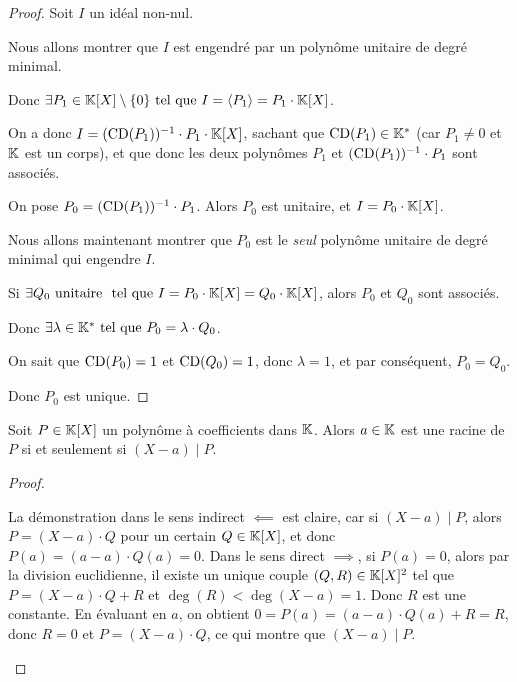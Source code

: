 \documentclass[12pt,a4paper]{report}
\begin{document}
\begin{proof}
    Soit $I$ un idéal non-nul.

    Nous allons montrer que $I$ est engendré par un polynôme unitaire de degré minimal.
    
    Donc $\exists P_1 \in \mathbb{K}[X] \setminus \{0\} \text{ tel que } I = \langle P_1 \rangle = P_1 \cdot \mathbb{K}[X]$.

    On a donc $I = (\mathrm{CD}(P_1))^{-1} \cdot P_1 \cdot \mathbb{K}[X]$, sachant que $\mathrm{CD}(P_1) \in \mathbb{K}^*$ (car $P_1 \ne 0$ et $\mathbb{K}$ est un corps), et que donc les deux polynômes $P_1$ et $(\mathrm{CD}(P_1))^{-1} \cdot P_1$ sont associés.

    On pose $P_0 = (\mathrm{CD}(P_1))^{-1} \cdot P_1$. Alors $P_0$ est unitaire, et $I = P_0 \cdot \mathbb{K}[X]$.

    Nous allons maintenant montrer que $P_0$ est le \textit{seul} polynôme unitaire de degré minimal qui engendre $I$.

    Si $\exists Q_0 \text{ unitaire } \text{ tel que } I = P_0 \cdot \mathbb{K}[X] = Q_0 \cdot \mathbb{K}[X]$, alors $P_0$ et $Q_0$ sont associés.

    Donc $\exists \lambda \in \mathbb{K}^* \text{ tel que } P_0 = \lambda \cdot Q_0$.

    On sait que $\mathrm{CD}(P_0) = 1$ et $\mathrm{CD}(Q_0) = 1$, donc $\lambda = 1$, et par conséquent, $P_0 = Q_0$.

    Donc $P_0$ est unique.
\end{proof}

\begin{property}
    Soit $P \in \mathbb{K}[X]$ un polynôme à coefficients dans $\mathbb{K}$. Alors $a \in \mathbb{K}$ est une racine de $P$ si et seulement si $(X-a) \mid P$.
\end{property}

\begin{proof}
    \begin{outline}
        \1 La démonstration dans le sens indirect $\impliedby$ est claire, car si $(X-a) \mid P$, alors $P = (X-a) \cdot Q$ pour un certain $Q \in \mathbb{K}[X]$, et donc $P(a) = (a-a) \cdot Q(a) = 0$.
        \1 Dans le sens direct $\implies$, si $P(a) = 0$, alors par la division euclidienne, il existe un unique couple $(Q,R) \in \mathbb{K}[X]^2$ tel que $P = (X-a) \cdot Q + R$ et $\deg(R) < \deg(X-a) = 1$. Donc $R$ est une constante. En évaluant en $a$, on obtient $0 = P(a) = (a-a) \cdot Q(a) + R = R$, donc $R = 0$ et $P = (X-a) \cdot Q$, ce qui montre que $(X-a) \mid P$.
    \end{outline}
\end{proof}
\end{document}
